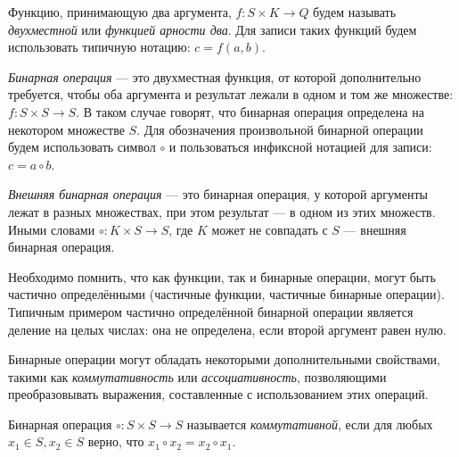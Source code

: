 \begin{definition}
	Функцию, принимающую два аргумента, $f: S \times K \to Q$ будем называть \emph{двухместной} или \emph{функцией арности два}.
	Для записи таких функций будем использовать типичную нотацию: $c = f(a,b)$.
\end{definition}


\begin{definition}
	\emph{Бинарная операция} --- это двухместная функция, от которой дополнительно требуется, чтобы оба аргумента и результат лежали в одном и том же множестве: $f: S \times S \to S$. В таком случае говорят, что бинарная операция определена на некотором множестве $S$. Для обозначения произвольной бинарной операции будем использовать символ $\circ$ и пользоваться инфиксной нотацией для записи: $c = a \circ b$.
\end{definition}




\begin{definition}
	\emph{Внешняя бинарная операция} --- это бинарная операция, у которой аргументы лежат в разных множествах, при этом результат --- в одном из этих множеств. Иными словами $\circ: K \times S \to S$, где $K$ может не совпадать с $S$  --- внешняя бинарная операция.
\end{definition}


Необходимо помнить, что как функции, так и бинарные операции, могут быть частично определёнными (частичные функции, частичные бинарные операции). Типичным примером частично определённой бинарной операции является деление на целых числах: она не определена, если второй аргумент равен нулю.


Бинарные операции могут обладать некоторыми дополнительными свойствами, такими как \textit{коммутативность} или \textit{ассоциативность}, позволяющими преобразовывать выражения, составленные с использованием этих операций.


\begin{definition}
	Бинарная операция $\circ : S \times S \to S$ называется \emph{коммутативной}, если для любых  $x_1 \in S, x_2 \in S$ верно, что  $x_1 \circ x_2 = x_2 \circ x_1$.
\end{definition}

